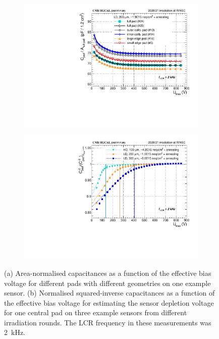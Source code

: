 \begin{figure}
	\captionsetup[subfigure]{aboveskip=-1pt,belowskip=-1pt}
	\centering
	\begin{subfigure}[b]{0.49\textwidth}
		\includegraphics[width=0.999\textwidth]{plots/channel_cv/channel_CV_sensors_channels.pdf}
		\subcaption{
		}
		\label{plot:pad_CV_channels}
	\end{subfigure}
	\hfill
	\begin{subfigure}[b]{0.49\textwidth}
		\includegraphics[width=0.999\textwidth]{plots/channel_cv/channel_invCV_sensors_sensors.pdf}
		\subcaption{
		}
		\label{plot:pad_invCV_sensor}
	\end{subfigure}
	\caption{
		(a) Area-normalised capacitances as a function of the effective bias voltage for different pads with different geometries on one example sensor.
		(b) Normalised squared-inverse capacitances as a function of the effective bias voltage for estimating the sensor depletion voltage for one central pad on three example sensors from different irradiation rounds.
		The LCR frequency in these measurements was \SI{2}{\kilo\hertz}.
	}
\end{figure}



